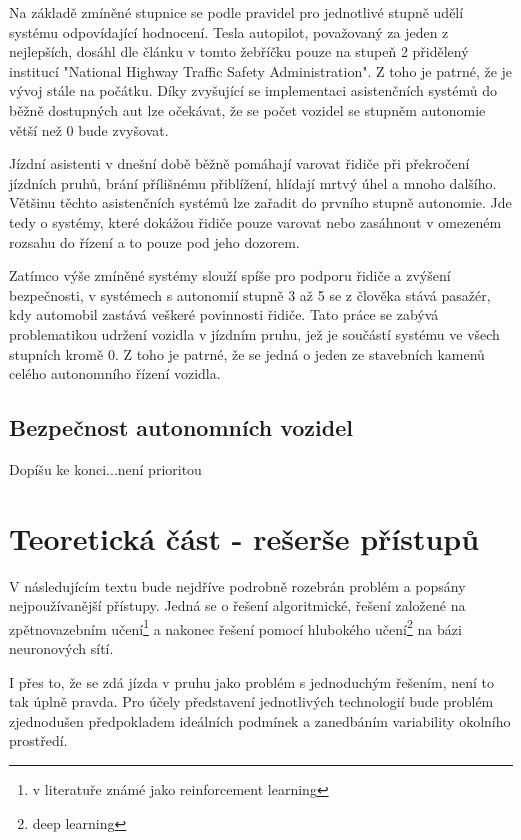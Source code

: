 \documentclass[czech, bc, kky, he, iso690alph]{fasthesis}
\begin{document}
       	Na základě zmíněné stupnice se podle pravidel pro jednotlivé stupně udělí systému odpovídající hodnocení. Tesla autopilot, považovaný za jeden z nejlepších, dosáhl dle článku \cite{autopilot} v tomto žebříčku pouze na stupeň 2 přidělený institucí "National Highway Traffic Safety Administration". Z toho je patrné, že je vývoj stále na počátku. Díky zvyšující se implementaci asistenčních systémů do běžně dostupných aut lze očekávat, že se počet vozidel se stupněm autonomie větší než 0 bude zvyšovat.         
        
        Jízdní asistenti v dnešní době běžně pomáhají varovat řidiče při překročení jízdních pruhů, brání přílišnému přiblížení, hlídají mrtvý úhel a mnoho dalšího. Většinu těchto asistenčních systémů lze zařadit do prvního stupně autonomie. Jde tedy o systémy, které dokážou řidiče pouze varovat nebo zasáhnout v omezeném rozsahu do řízení a to pouze pod jeho dozorem.
        
        Zatímco výše zmíněné systémy slouží spíše pro podporu řidiče a zvýšení bezpečnosti, v systémech s autonomií stupně 3 až 5 se z člověka stává pasažér, kdy automobil zastává veškeré povinnosti řidiče. Tato práce se zabývá problematikou udržení vozidla v jízdním pruhu, jež je součástí systému ve všech stupních kromě 0. Z toho je patrné, že se jedná o jeden ze stavebních kamenů celého autonomního řízení vozidla.\\
    \section{Bezpečnost autonomních vozidel}
    	Dopíšu ke konci...není prioritou
    \chapter{Teoretická část - rešerše přístupů}\label{chap:01_asisten_jizdy_v_pruhu}
	    V následujícím textu bude nejdříve podrobně rozebrán problém a popsány nejpoužívanější přístupy. Jedná se o řešení algoritmické, řešení založené na zpětnovazebním učení\footnote{v literatuře známé jako reinforcement learning} a nakonec řešení pomocí hlubokého učení\footnote{deep learning} na bázi neuronových sítí.
	    
        I přes to, že se zdá jízda v pruhu jako problém s jednoduchým řešením, není to tak úplně pravda. Pro účely představení jednotlivých technologií bude problém zjednodušen předpokladem ideálních podmínek a zanedbáním variability okolního prostředí.
        
\end{document}
